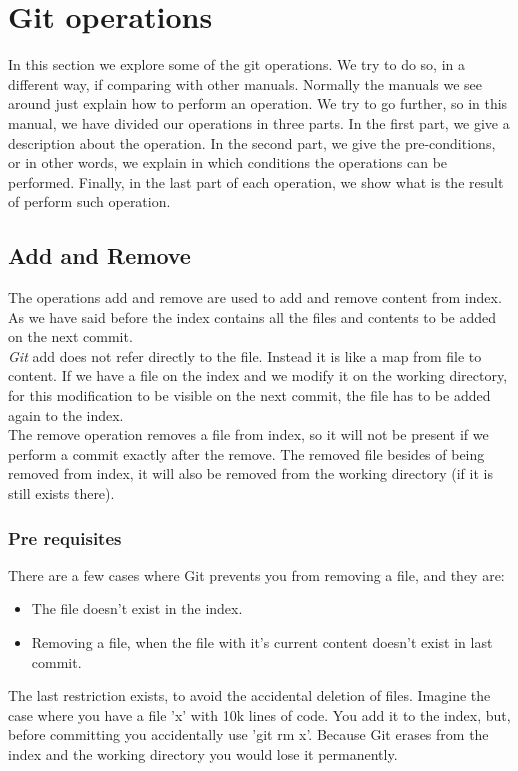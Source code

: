 \section{Git operations}
In this section we explore some of the git operations. We try to do
so, in a different way, if comparing with other manuals. Normally the
manuals we see around just explain how to perform an operation. We
try to go further, so in this manual, we have divided our operations in
three parts. In the first part, we give a description about the
operation. In the second part, we give the pre-conditions, or in other
words, we explain in which conditions the operations can be performed.
Finally, in the last part of each operation, we show what is the
result of perform such operation.

\subsection{Add and Remove}
The operations add and remove are used to add and remove content from
index. As we have said before the index contains all the files and
contents to be added on the next commit.\\

\emph{Git} add does not refer directly to the file. Instead it is like
a map from file to content. If we have a file on the index and we
modify it on the working directory, for this modification to be visible
on the next commit, the file has to be added again to the index.\\

The remove operation removes a file from index, so it will not be
present if we perform a commit exactly after the remove. The removed
file besides of being removed from index, it will also be removed from the 
working directory (if it is still exists there).

\subsubsection{Pre requisites}

There are a few cases where Git prevents you from removing a file, and they are: 
\begin{itemize}
\item The file doesn't exist in the index.
\item Removing a file, when the file with it's current content 
doesn't exist in last commit.
\end{itemize}
The last restriction exists, to avoid the accidental deletion of files. Imagine the
case where you have a file 'x' with 10k lines of code. You add it to the index,
but, before committing you accidentally use 'git rm x'. Because Git erases from
the index and the working directory you would lose it permanently. \par

